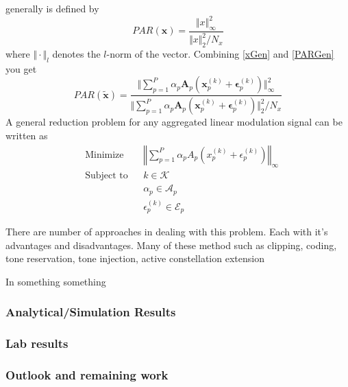 \PAR generally is defined by
\begin{equation}
PAR(\mathbf{x})=\frac{\Vert x \Vert^2_\infty}{\Vert x \Vert^2_2/N_x}
\label{PARGen}
\end{equation}
where $\Vert\cdot\Vert_l$ denotes the $l$-norm of the vector.  Combining \eqref{xGen} and \eqref{PARGen} you get
\begin{equation}
PAR(\mathbf{\tilde{x}})=\frac{\Vert \sum_{p=1}^P\alpha_p\mathbf{A}_p\left(\mathbf{x}_p^{(k)}+\mathbf{\epsilon}_p^{(k)}\right) \Vert^2_\infty}{\Vert \sum_{p=1}^P\alpha_p\mathbf{A}_p\left(\mathbf{x}_p^{(k)}+\mathbf{\epsilon}_p^{(k)}\right) \Vert^2_2/N_x}
\end{equation}
A general \PAR reduction problem for any aggregated linear modulation signal can be written as
\begin{equation}
     \begin{aligned}
      &\text{Minimize } & &\left\Vert\sum_{p=1}^P\alpha_pA_p\left(x_p^{(k)}+\epsilon_p^{(k)}\right)\right\Vert_\infty  \\
      &\text{Subject to} &  &k\in \mathcal{K} \\
      & & &\alpha_p\in\mathcal{A}_p\\
      & & &\epsilon_p^{(k)}\in\mathcal{E}_p 
     \end{aligned}
\end{equation}

There are number of approaches in dealing with this \PAR problem.  Each with it's advantages and disadvantages.  Many of these method such as clipping, coding, tone reservation, tone injection, active constellation extension

In \cite{seung05} something something
\subsubsection{Analytical/Simulation Results}
\subsubsection{Lab results}
\subsubsection{Outlook and remaining work}
